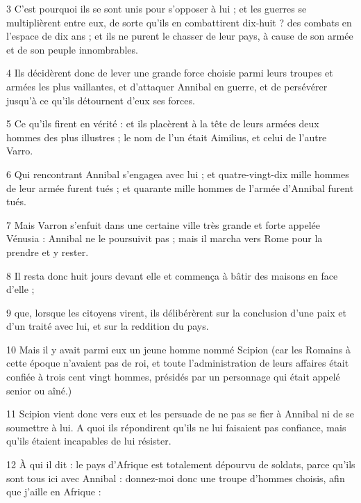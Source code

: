 \par 3 C'est pourquoi ils se sont unis pour s'opposer à lui ; et les guerres se multiplièrent entre eux, de sorte qu'ils en combattirent dix-huit ? des combats en l’espace de dix ans ; et ils ne purent le chasser de leur pays, à cause de son armée et de son peuple innombrables.

\par 4 Ils décidèrent donc de lever une grande force choisie parmi leurs troupes et armées les plus vaillantes, et d'attaquer Annibal en guerre, et de persévérer jusqu'à ce qu'ils détournent d'eux ses forces.

\par 5 Ce qu'ils firent en vérité : et ils placèrent à la tête de leurs armées deux hommes des plus illustres ; le nom de l'un était Aimilius, et celui de l'autre Varro.

\par 6 Qui rencontrant Annibal s'engagea avec lui ; et quatre-vingt-dix mille hommes de leur armée furent tués ; et quarante mille hommes de l'armée d'Annibal furent tués.

\par 7 Mais Varron s'enfuit dans une certaine ville très grande et forte appelée Vénusia : Annibal ne le poursuivit pas ; mais il marcha vers Rome pour la prendre et y rester.

\par 8 Il resta donc huit jours devant elle et commença à bâtir des maisons en face d'elle ;

\par 9 que, lorsque les citoyens virent, ils délibérèrent sur la conclusion d'une paix et d'un traité avec lui, et sur la reddition du pays.

\par 10 Mais il y avait parmi eux un jeune homme nommé Scipion (car les Romains à cette époque n'avaient pas de roi, et toute l'administration de leurs affaires était confiée à trois cent vingt hommes, présidés par un personnage qui était appelé senior ou aîné.)

\par 11 Scipion vient donc vers eux et les persuade de ne pas se fier à Annibal ni de se soumettre à lui. A quoi ils répondirent qu'ils ne lui faisaient pas confiance, mais qu'ils étaient incapables de lui résister.

\par 12 À qui il dit : le pays d'Afrique est totalement dépourvu de soldats, parce qu'ils sont tous ici avec Annibal : donnez-moi donc une troupe d'hommes choisis, afin que j'aille en Afrique :

